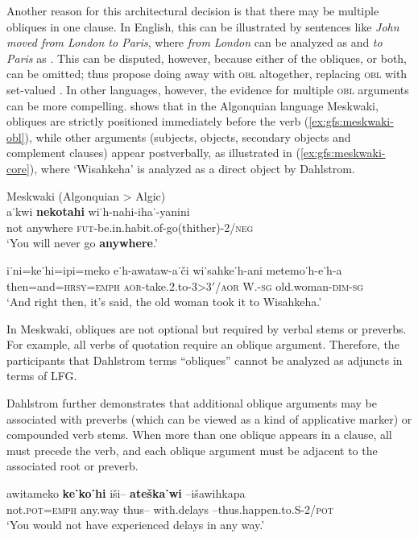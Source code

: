 \documentclass[output=paper]{../langscibook}
\begin{document}
 Another reason for this architectural decision is that there may be multiple obliques in one clause. In English, this can be illustrated by sentences like \textit{John moved from London to Paris}, where \textit{from London} can be analyzed as {} and \textit{to Paris} as {}. This can be disputed, however, because either of the obliques, or both, can be omitted; thus \citet{ZaenenCrouch2009} propose doing away with \textsc{obl} altogether, replacing \textsc{obl} with set-valued \ADJ. In other languages, however, the evidence for multiple \textsc{obl} arguments can be more compelling. \citet{dahlstrom2014} shows that in the Algonquian language Meskwaki, obliques are strictly positioned immediately before the verb (\ref{ex:gfs:meskwaki-obl}), while other arguments (subjects, objects, secondary objects and complement clauses) appear postverbally, as illustrated in (\ref{ex:gfs:meskwaki-core}), where `Wisahkeha' is analyzed as a direct object by Dahlstrom.
 
 \ea\label{ex:gfs:meskwaki-obl}
 Meskwaki (Algonquian > Algic)\\
 \gll a˙kwi \textbf{nekotahi} wi˙h-nahi-iha˙-yanini\\
 not anywhere \textsc{fut}-be.in.habit.of-go(thither)-\textsc{2/neg}\\
 \trans `You will never go \textbf{anywhere}.' \citep[57]{dahlstrom2014}
 
 \ex\label{ex:gfs:meskwaki-core}
 \gll i˙ni=ke˙hi=ipi=meko e˙h-awataw-a˙či wi˙sahke˙h-ani metemo˙h-e˙h-a\\
 then=and=\textsc{hrsy=emph} \textsc{aor-}take.\OBJ2.to-3>3$'${}\textsc{/aor} W.-\textsc{sg} old.woman\textsc{-dim-sg}\\
 \trans `And right then, it's said, the old woman took it to Wisahkeha.' \citep[58]{dahlstrom2014}
 \z
 
 In Meskwaki, obliques are not optional but required by verbal stems or preverbs. For example, all verbs of quotation require an oblique argument. Therefore, the participants that Dahlstrom terms ``obliques'' cannot be analyzed as adjuncts in terms of LFG.
 
 Dahlstrom further demonstrates that additional oblique arguments may be associated with preverbs (which can be viewed as a kind of applicative marker) or compounded verb stems. When more than one oblique appears in a clause, all must precede the verb, and each oblique argument must be adjacent to the associated root or preverb.
 
 \ea\label{ex:gfs:meskwaki-multobl}
 \gll awitameko \textbf{ke˙ko˙hi} iši-- \textbf{ateška˙wi} --išawihkapa\\
 not.\textsc{pot=emph} any.way thus-- with.delays --thus.happen.to.S-2/\textsc{pot}\\
 \trans `You would not have experienced delays in any way.' \citep[64]{dahlstrom2014}
 \z
 
\end{document}
